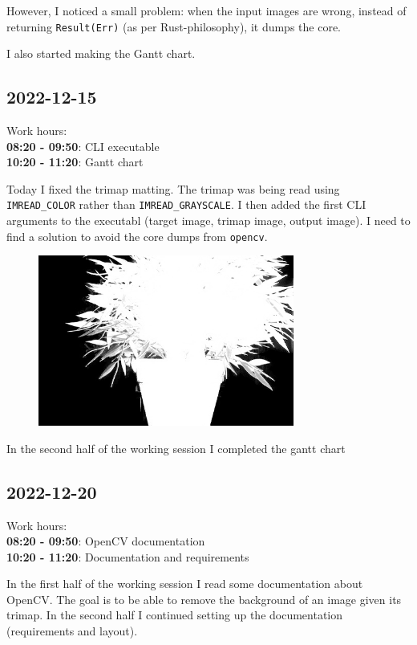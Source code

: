 \documentclass{article}
\begin{document}
However, I noticed a small problem: when the input images are
wrong, instead of returning \texttt{Result(Err)} (as per Rust-philosophy),
it dumps the core.

I also started making the Gantt chart.

\pagebreak

\subsection{2022-12-15}

Work hours:\\
\textbf{08:20 - 09:50}: CLI executable \\
\textbf{10:20 - 11:20}: Gantt chart

Today I fixed the trimap matting. The trimap was being read using
\texttt{IMREAD\_COLOR} rather than \texttt{IMREAD\_GRAYSCALE}.
I then added the first CLI arguments to the executabl (target image,
trimap image, output image).
I need to find a solution to avoid the core dumps from \texttt{opencv}.

\begin{figure}[h]
    \centering
    \includegraphics[width=0.75\textwidth]{res2}
\end{figure}

In the second half of the working session I completed the gantt chart

\subsection{2022-12-20}

Work hours:\\
\textbf{08:20 - 09:50}: OpenCV documentation \\
\textbf{10:20 - 11:20}: Documentation and requirements

In the first half of the working session I read
some documentation about OpenCV.
The goal is to be able to remove the background of an image
given its trimap.
In the second half I continued setting up the documentation
(requirements and layout).
\end{document}
